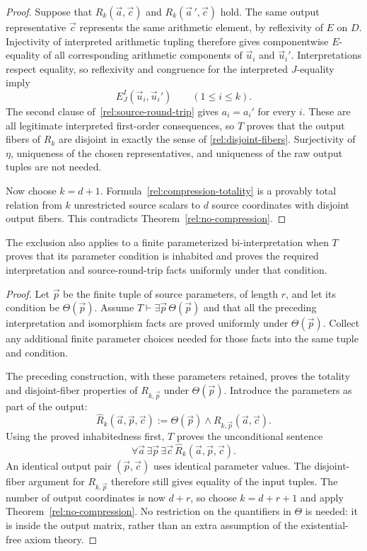 \begin{proof}
Suppose that $R_k(\vec a,\vec c)$ and
$R_k(\vec a\,',\vec c)$ hold. The same output representative
$\vec c$ represents the same arithmetic element, by reflexivity of $E$
on $D$. Injectivity of interpreted arithmetic tupling therefore gives
componentwise $E$-equality of all corresponding arithmetic components
of $\vec u_i$ and $\vec u_i'$. Interpretations respect equality, so
reflexivity and congruence for the interpreted $J$-equality imply
\[
                         E_{J}^{I}(\vec u_i,\vec u_i')
                         \qquad(1\le i\le k).
\]
The second clause of~\eqref{rel:source-round-trip} gives
$a_i=a_i'$ for every $i$. These are all legitimate interpreted
first-order consequences, so $T$ proves that the output fibers of
$R_k$ are disjoint in exactly the sense of
\eqref{rel:disjoint-fibers}. Surjectivity of $\eta$, uniqueness of the
chosen representatives, and uniqueness of the raw output tuples are
not needed.

Now choose $k=d+1$. Formula~\eqref{rel:compression-totality} is a
provably total relation from $k$ unrestricted source scalars to $d$
source coordinates with disjoint output fibers. This contradicts
Theorem~\ref{rel:no-compression}.
\end{proof}

\begin{corollary}
\label{rel:parameter-families}
The exclusion also applies to a finite parameterized bi-interpretation
when $T$ proves that its parameter condition is inhabited and proves the
required interpretation and source-round-trip facts uniformly under
that condition.
\end{corollary}

\begin{proof}
Let $\vec p$ be the finite tuple of source parameters, of length $r$,
and let its condition be $\Theta(\vec p)$. Assume
$T\vdash\exists\vec p\,\Theta(\vec p)$ and that all the preceding
interpretation and isomorphism facts are proved uniformly under
$\Theta(\vec p)$. Collect any additional finite parameter choices
needed for those facts into the same tuple and condition.

The preceding construction, with these parameters retained, proves
the totality and disjoint-fiber properties of $R_{k,\vec p}$ under
$\Theta(\vec p)$. Introduce the parameters as part of the output:
\[
 \widehat R_k(\vec a,\vec p,\vec c)
       :=\Theta(\vec p)\wedge R_{k,\vec p}(\vec a,\vec c).
\]
Using the proved inhabitedness first, $T$ proves the unconditional
sentence
\[
            \forall\vec a\,\exists\vec p\,\exists\vec c\,
                  \widehat R_k(\vec a,\vec p,\vec c).
\]
An identical output pair $(\vec p,\vec c)$ uses identical parameter
values. The disjoint-fiber argument for $R_{k,\vec p}$ therefore still
gives equality of the input tuples. The number of output coordinates is
now $d+r$, so choose $k=d+r+1$ and apply
Theorem~\ref{rel:no-compression}. No restriction on the quantifiers in
$\Theta$ is needed: it is inside the output matrix, rather than an
extra assumption of the existential-free axiom theory.
\end{proof}

